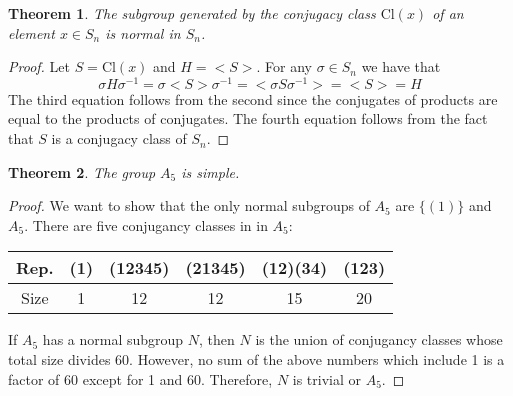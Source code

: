 \documentclass[a4paper,10pt]{article}
\newtheorem{theorem}{Theorem}[section]
\theoremstyle{definition}
\begin{document}
\begin{theorem}
The subgroup generated by the conjugacy class $\textrm{Cl}(x)$ of an element $x \in S_n$ is normal in $S_n$.   
\end{theorem}
\begin{proof}
Let $S = \textrm{Cl}(x)$ and $H = <S>$. For any $\sigma\in S_n$ we have that
\begin{equation}
\sigma H \sigma^{-1} = \sigma <S> \sigma^{-1} = <\sigma S \sigma^{-1}> = <S> = H 
\end{equation}
The third equation follows from the second since the conjugates of products are equal to the products of conjugates. The fourth equation follows from the fact that $S$ is a conjugacy class of $S_n$.
\end{proof}

\begin{theorem}
The group $A_5$ is simple. 
\end{theorem}

\begin{proof}
We want to show that the only normal subgroups of $A_5$ are $\{(1)\}$ and $A_5$. There are five conjugancy classes in in $A_5$:
\begin{center}
  \begin{tabular}{ | c || c | c | c | c | c |}
    \hline
    Rep. & (1) & (12345) & (21345) & (12)(34) & (123) \\ \hline
    Size & 1 & 12 & 12 & 15 & 20 \\ 
    \hline
  \end{tabular}
\end{center}

If $A_5$ has a normal subgroup $N$, then $N$ is the union of conjugancy classes whose total size divides 60. However, no sum of the above numbers which include 1 is a factor of 60 except for 1 and 60. Therefore, $N$ is trivial or $A_5$.
\end{proof}
\end{document}
